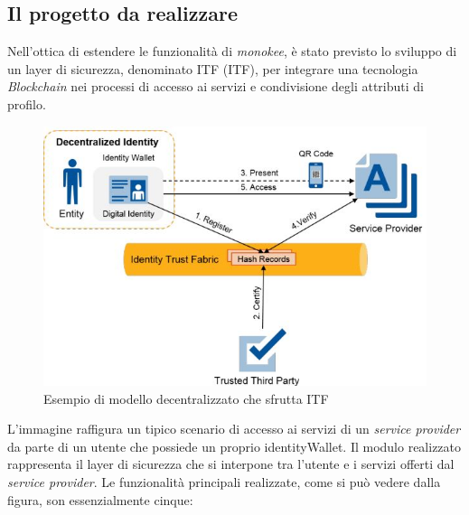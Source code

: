 \subsection{Il progetto da realizzare}
Nell'ottica di estendere le funzionalità di \emph{\gls{monokee}}\glsfirstoccur, è stato previsto lo sviluppo di un layer di sicurezza, denominato \gls{ITF} (ITF), per integrare una tecnologia \textit{Blockchain} nei processi di accesso ai servizi e condivisione degli attributi di profilo.\\
\begin{figure}[!h]
	\centering
	\includegraphics[scale=0.50]{immagini/ITF_Modello_Funzionale}
	\caption{Esempio di modello decentralizzato che sfrutta ITF}
\end{figure}
L'immagine raffigura un tipico scenario di accesso ai servizi di un \textit{service provider} da parte di un utente che possiede un proprio \gls{identityWallet}.
Il modulo realizzato rappresenta il layer di sicurezza che si interpone tra l'utente e i servizi offerti dal \textit{service provider}.
Le funzionalità principali realizzate, come si può vedere dalla figura, son essenzialmente cinque:
